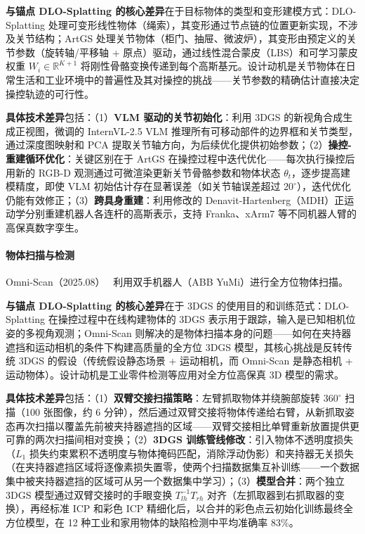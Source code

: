 \textbf{与锚点 DLO-Splatting 的核心差异}在于目标物体的类型和变形建模方式：DLO-Splatting 处理可变形线性物体（绳索），其变形通过节点链的位置更新实现，不涉及关节结构；ArtGS 处理关节物体（柜门、抽屉、微波炉），其变形由预定义的关节参数（旋转轴/平移轴 + 原点）驱动，通过线性混合蒙皮（LBS）和可学习蒙皮权重 $W_i \in \mathbb{R}^{K+1}$ 将刚性骨骼变换传递到每个高斯基元。设计动机是关节物体在日常生活和工业环境中的普遍性及其对操控的挑战——关节参数的精确估计直接决定操控轨迹的可行性。

\textbf{具体技术差异}包括：（1）\textbf{VLM 驱动的关节初始化}：利用 3DGS 的新视角合成生成正视图，微调的 InternVL-2.5 VLM 推理所有可移动部件的边界框和关节类型，通过深度图映射和 PCA 提取关节轴方向，为后续优化提供初始参数；（2）\textbf{操控-重建循环优化}：关键区别在于 ArtGS 在操控过程中迭代优化——每次执行操控后用新的 RGB-D 观测通过可微渲染更新关节骨骼参数和物体状态 $\theta_t$，逐步提高建模精度，即使 VLM 初始估计存在显著误差（如关节轴误差超过 $20^\circ$），迭代优化仍能有效修正；（3）\textbf{跨具身重建}：利用修改的 Denavit-Hartenberg（MDH）正运动学分别重建机器人各连杆的高斯表示，支持 Franka、xArm7 等不同机器人臂的高保真数字孪生。

\paragraph{物体扫描与检测}

Omni-Scan（2025.08）~\cite{2508_00354} 利用双手机器人（ABB YuMi）进行全方位物体扫描。

\textbf{与锚点 DLO-Splatting 的核心差异}在于 3DGS 的使用目的和训练范式：DLO-Splatting 在操控过程中在线构建物体的 3DGS 表示用于跟踪，输入是已知相机位姿的多视角观测；Omni-Scan 则解决的是物体扫描本身的问题——如何在夹持器遮挡和运动相机的条件下构建高质量的全方位 3DGS 模型，其核心挑战是反转传统 3DGS 的假设（传统假设静态场景 + 运动相机，而 Omni-Scan 是静态相机 + 运动物体）。设计动机是工业零件检测等应用对全方位高保真 3D 模型的需求。

\textbf{具体技术差异}包括：（1）\textbf{双臂交接扫描策略}：左臂抓取物体并绕腕部旋转 $360^\circ$ 扫描（100 张图像，约 6 分钟），然后通过双臂交接将物体传递给右臂，从新抓取姿态再次扫描以覆盖先前被夹持器遮挡的区域——双臂交接相比单臂重新放置提供更可靠的两次扫描间相对变换；（2）\textbf{3DGS 训练管线修改}：引入物体不透明度损失（$L_1$ 损失约束累积不透明度与物体掩码匹配，消除浮动伪影）和夹持器无关损失（在夹持器遮挡区域将逐像素损失置零，使两个扫描数据集互补训练——一个数据集中被夹持器遮挡的区域可从另一个数据集中学习）；（3）\textbf{模型合并}：两个独立 3DGS 模型通过双臂交接时的手眼变换 $T_{lh}^{-1} T_{rh}$ 对齐（左抓取器到右抓取器的变换），再经标准 ICP 和彩色 ICP 精细化后，以合并的彩色点云初始化训练最终全方位模型，在 12 种工业和家用物体的缺陷检测中平均准确率 83\%。

